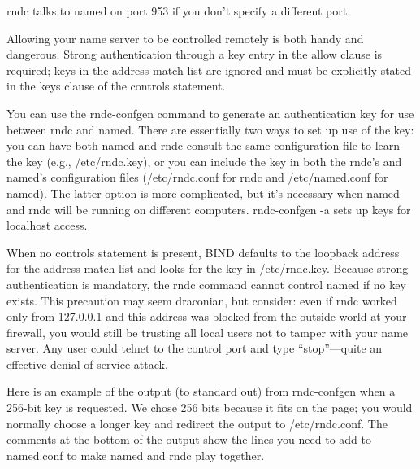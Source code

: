 
{rndc }talks to {named }on port 953 if you don't specify a different
port.

Allowing your name server to be controlled remotely is both handy and
dangerous. Strong authentication through a {key} entry in the {allow}
clause is required; keys in the address match list are ignored and must
be explicitly stated in the {keys} clause of the {controls} statement.

You can use the
\protect\hypertarget{part0024_split_045.htmlux5cux23_idIndexMarker2201}{}{}\protect\hypertarget{part0024_split_045.htmlux5cux23_idIndexMarker2202}{}{}{rndc-confgen}
command to generate an authentication key for use between {rndc} and
{named}. There are essentially two ways to set up use of the key: you
can have both {named} and {rndc} consult the same configuration file to
learn the key (e.g.,
\protect\hypertarget{part0024_split_045.htmlux5cux23_idIndexMarker2203}{}{}\protect\hypertarget{part0024_split_045.htmlux5cux23_idIndexMarker2204}{}{}{/etc/rndc.key}),
or you can include the key in both the {rndc}'s and {named}'s
configuration files
\protect\hypertarget{part0024_split_045.htmlux5cux23_idIndexMarker2205}{}{}\protect\hypertarget{part0024_split_045.htmlux5cux23_idIndexMarker2206}{}{}({/etc/rndc.conf}
for {rndc} and {/etc/named.conf} for {named}). The latter option is more
complicated, but it's necessary when {named} and {rndc} will be running
on different computers. {rndc-confgen -a} sets up keys for localhost
access.

When no {controls} statement is present, BIND defaults to the loopback
address for the address match list and looks for the key in
{/etc/rndc.key}. Because strong authentication is mandatory, the {rndc}
command cannot control {named} if no key exists. This precaution may
seem draconian, but consider: even if {rndc} worked only from 127.0.0.1
and this address was blocked from the outside world at your firewall,
you would still be trusting all local users not to tamper with your name
server. Any user could {telnet} to the control port and type
``stop''---quite an effective denial-of-service attack.

Here is an example of the output (to standard out) from {rndc-confgen}
when a 256-bit key is requested. We chose 256 bits because it fits on
the page; you would normally choose a longer key and redirect the output
to {/etc/rndc.conf}. The comments at the bottom of the output show the
lines you need to add to {named.conf} to make {named} and {rndc} play
together.

